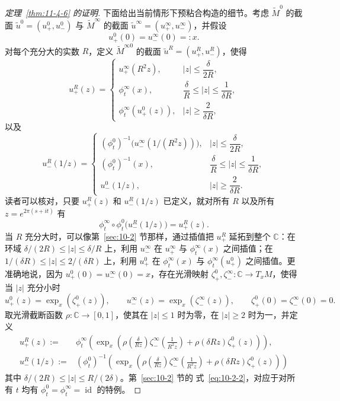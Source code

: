 \begin{proof}[定理~\ref{thm:11-4-6} 的证明]
下面给出当前情形下预粘合构造的细节。考虑 $\widetilde M^0$ 的截面
$\widetilde u^0=(u_+^0,u_-^0)$ 与 $\widetilde M^\infty$ 的截面
$\widetilde u^\infty=(u_+^\infty,u_-^\infty)$，并假设
\[
  u_+^0(0)=u_-^\infty(0)=:x.
\]
对每个充分大的实数 $R$，定义 $\widetilde M^{\infty0}$ 的截面
$\widetilde u^R=(u_+^R,u_-^R)$，使得
\[
u_+^R(z)=
\begin{cases}
  u_+^\infty(R^2z),& |z|\le\dfrac{\delta}{2R},\\[3pt]
  \phi_t^\infty(x),& \dfrac{\delta}{R}\le|z|\le\dfrac1{\delta R},\\[3pt]
  \phi_t^\infty(u_+^0(z)),& |z|\ge\dfrac2{\delta R},
\end{cases}
\]
以及
\[
u_-^R(1/z)=
\begin{cases}
  (\phi_t^0)^{-1}\bigl(u_-^\infty(1/(R^2z))\bigr),
    & |z|\le\dfrac{\delta}{2R},\\[3pt]
  (\phi_t^0)^{-1}(x),
    & \dfrac{\delta}{R}\le|z|\le\dfrac1{\delta R},\\[3pt]
  u_-^0(1/z),& |z|\ge\dfrac2{\delta R}.
\end{cases}
\]
读者可以核对，只要 $u_+^R(z)$ 和 $u_-^R(1/z)$ 已定义，就对所有 $R$ 以及所有
$z=e^{2\pi(s+it)}$ 有
\[
  \phi_t^\infty\circ\phi_t^0\bigl(u_-^R(1/z)\bigr)=u_+^R(z).
\]
当 $R$ 充分大时，可以像第~\ref{sec:10-2} 节那样，通过插值把 $u_+^R$ 延拓到整个
$\mathbb C$：在环域 $\delta/(2R)\le|z|\le\delta/R$ 上，利用 $u_-^\infty$ 在
$u_+^\infty$ 与 $\phi_t^\infty(x)$ 之间插值；在
$1/(\delta R)\le|z|\le2/(\delta R)$ 上，利用 $u_+^0$ 在
$\phi_t^\infty(x)$ 与 $\phi_t^\infty(u_+^0)$ 之间插值。更准确地说，因为
$u_+^0(0)=u_-^\infty(0)=x$，存在光滑映射
$\zeta_+^0,\zeta_-^\infty:\mathbb C\to T_xM$，使得当 $|z|$ 充分小时
\[
  u_+^0(z)=\exp_x(\zeta_+^0(z)),
  \qquad
  u_-^\infty(z)=\exp_x(\zeta_-^\infty(z)),
  \qquad
  \zeta_+^0(0)=\zeta_-^\infty(0)=0.
\]
取光滑截断函数 $\rho:\mathbb C\to[0,1]$，使其在 $|z|\le1$ 时为零，在
$|z|\ge2$ 时为一，并定义
\[
\begin{aligned}
u_+^R(z):={}&\phi_t^\infty\!\left(
  \exp_x\!\left(
  \rho\!\left(\frac\delta{Rz}\right)
  \zeta_-^\infty\!\left(\frac1{R^2z}\right)
  +\rho(\delta Rz)\zeta_+^0(z)
  \right)\right),\\
u_-^R(1/z):={}&(\phi_t^0)^{-1}\!\left(
  \exp_x\!\left(
  \rho\!\left(\frac\delta{Rz}\right)
  \zeta_-^\infty\!\left(\frac1{R^2z}\right)
  +\rho(\delta Rz)\zeta_+^0(z)
  \right)\right)
\end{aligned}
\]
其中 $\delta/(2R)\le|z|\le R/(2\delta)$。第~\ref{sec:10-2} 节的
式~\eqref{eq:10-2-2}，对应于对所有 $t$ 均有
$\phi_t^0=\phi_t^\infty=\operatorname{id}$ 的特例。


\end{proof}
